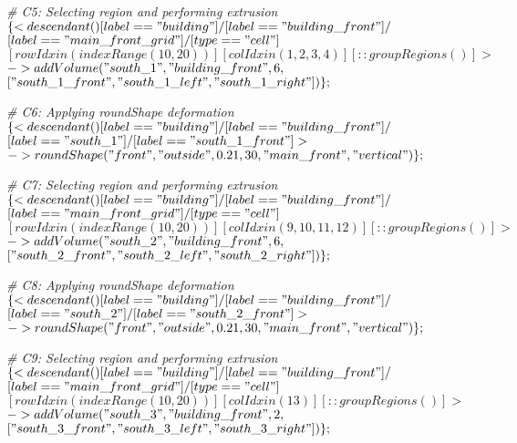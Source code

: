 \noindent \textit{\# C5: Selecting region and performing extrusion}\\
$\{< descendant() [label=="building"] / [label=="building\_front"] / $\\
$[label=="main\_front\_grid"] / [type=="cell"] $\\
$[rowIdx in (indexRange(10, 20))] [colIdx in (1, 2, 3, 4)] [::groupRegions()] > $\\
$-> addVolume("south\_1", "building\_front", 6, $\\
$["south\_1\_front", "south\_1\_left", "south\_1\_right"])\};$

\noindent \textit{\# C6: Applying roundShape deformation}\\
$\{< descendant() [label=="building"] / [label=="building\_front"] / $\\
$[label=="south\_1"] / [label=="south\_1\_front"] > $\\
$-> roundShape("front", "outside", 0.21, 30, "main\_front", "vertical")\};$

\noindent \textit{\# C7: Selecting region and performing extrusion}\\
$\{< descendant() [label=="building"] / [label=="building\_front"] / $\\
$[label=="main\_front\_grid"] / [type=="cell"] $\\
$[rowIdx in (indexRange(10, 20))] [colIdx in (9, 10, 11, 12)] [::groupRegions()] > $\\
$-> addVolume("south\_2", "building\_front", 6, $\\
$["south\_2\_front", "south\_2\_left", "south\_2\_right"])\};$

\noindent \textit{\# C8: Applying roundShape deformation}\\
$\{< descendant() [label=="building"] / [label=="building\_front"] / $\\
$[label=="south\_2"] / [label=="south\_2\_front"] > $\\
$-> roundShape("front", "outside", 0.21, 30, "main\_front", "vertical")\};$

\noindent \textit{\# C9: Selecting region and performing extrusion}\\
$\{< descendant() [label=="building"] / [label=="building\_front"] / $\\
$[label=="main\_front\_grid"] / [type=="cell"] $\\
$[rowIdx in (indexRange(10, 20))] [colIdx in (13)] [::groupRegions()] > $\\
$-> addVolume("south\_3", "building\_front", 2, $\\
$["south\_3\_front", "south\_3\_left", "south\_3\_right"])\};$

